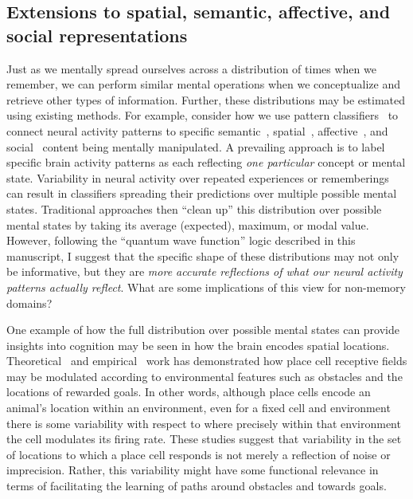 \documentclass{article}
\begin{document}



\subsection*{Extensions to spatial, semantic, affective, and social representations}
Just as we mentally spread ourselves across a distribution of times when we remember, we can perform similar mental operations when we conceptualize and retrieve other types of information.  Further, these distributions may be estimated using existing methods.  For example, consider how we use pattern classifiers~\citep{NormEtal06b} to connect neural activity patterns to specific semantic~\citep{PolyEtal05a, MitcEtal08a, MannEtal12}, spatial~\citep{MillEtal13}, affective~\citep{ChanEtal18}, and social~\citep{MeyeEtal18} content being mentally manipulated.
A prevailing approach is to label specific brain activity patterns as each reflecting \textit{one particular} concept or mental state.  Variability in neural activity over repeated experiences or rememberings can result in classifiers spreading their predictions over multiple possible mental states.  Traditional approaches then ``clean up'' this distribution over possible mental states by taking its average (expected), maximum, or modal value.  However, following the ``quantum wave function'' logic described in this manuscript, I suggest that the specific shape of these distributions may not only be informative, but they are \textit{more accurate reflections of what our neural activity patterns actually reflect}.  What are some implications of this view for non-memory domains?

One example of how the full distribution over possible mental states can provide insights into cognition may be seen in how the brain encodes spatial locations.  Theoretical~\citep[e.g., ][]{GersAbbo97} and empirical~\citep[e.g., ][]{PfeiFost13} work has demonstrated how place cell receptive fields may be modulated according to environmental features such as obstacles and the locations of rewarded goals.  In other words, although place cells encode an animal's location within an environment, even for a fixed cell and environment there is some variability with respect to where precisely within that environment the cell modulates its firing rate.  These studies suggest that variability in the set of locations to which a place cell responds is not merely a reflection of noise or imprecision.  Rather, this variability might have some functional relevance in terms of facilitating the learning of paths around obstacles and towards goals.
\end{document}
